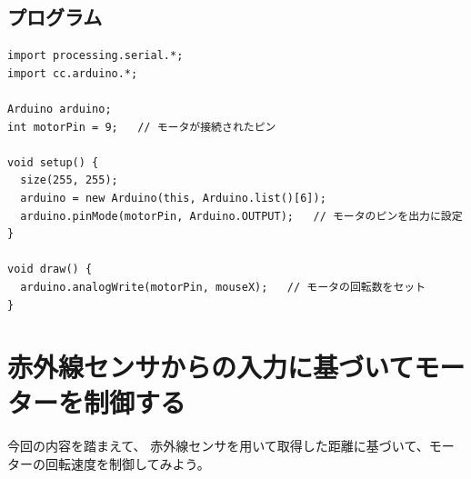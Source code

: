 \documentclass[11pt,a4paper]{jarticle}
\begin{document}
\subsection*{プログラム}
\begin{lstlisting}
import processing.serial.*;
import cc.arduino.*;
 
Arduino arduino;
int motorPin = 9;   // モータが接続されたピン
 
void setup() {
  size(255, 255);
  arduino = new Arduino(this, Arduino.list()[6]);
  arduino.pinMode(motorPin, Arduino.OUTPUT);   // モータのピンを出力に設定
}
 
void draw() {
  arduino.analogWrite(motorPin, mouseX);   // モータの回転数をセット
}
\end{lstlisting}


\section{赤外線センサからの入力に基づいてモーターを制御する}
今回の内容を踏まえて、
赤外線センサを用いて取得した距離に基づいて、モーターの回転速度を制御してみよう。


\end{document}
